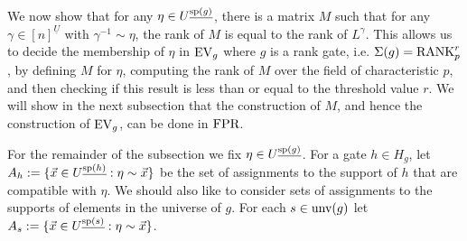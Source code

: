 \documentclass[../paper.tex]{subfiles}
\begin{document}


We now show that for any $\eta \in U^{\underline{\text{sp}(g)}}$, there is a matrix
$M$ such that for any $\gamma \in [n]^{\underline{U}}$ with $\gamma^{-1} \sim
\eta$, the rank of $M$ is equal to the rank of $L^{\gamma}$. This allows us to
decide the membership of $\eta$ in $\text{EV}_g$ where $g$ is a rank gate, i.e.
$\Sigma(g) = \text{\upshape RANK}^r_p$, by defining $M$ for $\eta$, computing the rank of $M$
over the field of characteristic $p$, and then checking if this result is less
than or equal to the threshold value $r$. We will show in the next subsection
that the construction of $M$, and hence the construction of $\text{EV}_g$, can be done
in $\text{\upshape FPR}$.

For the remainder of the subsection we fix $\eta \in U^{\underline{\text{sp}(g)}}$.
For a gate $h \in H_g$, let $A_h := \{\vec{x} \in U^{\underline{\text{sp}(h)}} :
\eta \sim \vec{x}\}$ be the set of assignments to the support of $h$ that are
compatible with $\eta$. We should also like to consider sets of assignments to
the supports of elements in the universe of $g$. For each $s \in \text{unv}(g)$
let $A_s := \{\vec{x} \in U^{\underline{\text{sp}(s)}} : \eta \sim \vec{x}\}$.
\end{document}
